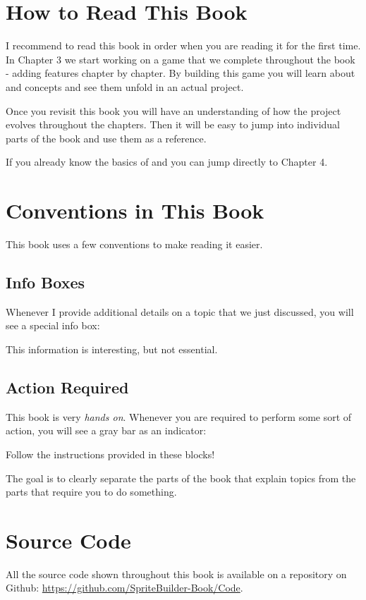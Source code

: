 \section{How to Read This Book}
I recommend to read this book in order when you are reading it for the first
time. In Chapter 3 we start working on a game that we complete throughout the
book - adding features chapter by chapter. By building this game you will learn
about \SB{} and \cocos{} concepts and see them unfold in an actual project.

Once you revisit this book you will have an understanding of how the project
evolves throughout the chapters. Then it will be easy to jump into individual
parts of the book and use them as a reference.

If you already know the basics of \cocos{} and \SB{} you can jump directly to
Chapter 4.

\section{Conventions in This Book}
This book uses a few conventions to make reading it easier. 

\subsection{Info Boxes}
Whenever I provide additional details on a topic that we just discussed, you
will see a special info box:
\begin{details}
This information is interesting, but not essential.
\end{details}

\subsection{Action Required}
This book is very \textit{hands on}. Whenever you are required to perform some
sort of action, you will see a gray bar as an indicator:

\begin{leftbar}
Follow the instructions provided in these blocks!
\end{leftbar}

The goal is to clearly separate the parts of the book that explain topics from
the parts that require you to do something.

\section{Source Code}
All the source code shown throughout this book is available on a repository on
Github: \url{https://github.com/SpriteBuilder-Book/Code}. 

